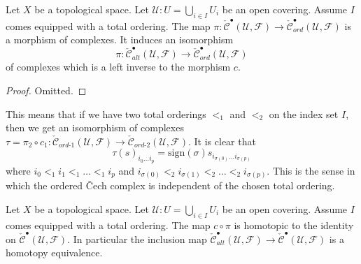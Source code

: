 \begin{lemma}
\label{lemma-project-to-ordered}
Let $X$ be a topological space.
Let $\mathcal{U} : U = \bigcup_{i \in I} U_i$ be an open covering.
Assume $I$ comes equipped with a total ordering.
The map $\pi : \check{\mathcal{C}}^\bullet(\mathcal{U}, \mathcal{F})
\to \check{\mathcal{C}}_{ord}^\bullet(\mathcal{U}, \mathcal{F})$
is a morphism of complexes. It induces an isomorphism
$$
\pi : \check{\mathcal{C}}_{alt}^\bullet(\mathcal{U}, \mathcal{F})
\to \check{\mathcal{C}}_{ord}^\bullet(\mathcal{U}, \mathcal{F})
$$
of complexes which is a left inverse to the morphism $c$.
\end{lemma}

\begin{proof}
Omitted.
\end{proof}

\begin{remark}
\label{remark-compared-ordered-complexes}
This means that if we have two total orderings $<_1$ and $<_2$ on
the index set $I$, then we get an isomorphism of complexes
$\tau = \pi_2 \circ c_1 :
\check{\mathcal{C}}_{ord\text{-}1}(\mathcal{U}, \mathcal{F}) \to
\check{\mathcal{C}}_{ord\text{-}2}(\mathcal{U}, \mathcal{F})$.
It is clear that
$$
\tau(s)_{i_0 \ldots i_p} =
\text{sign}(\sigma) s_{i_{\sigma(0)} \ldots i_{\sigma(p)}}
$$
where $i_0 <_1 i_1 <_1 \ldots <_1 i_p$ and
$i_{\sigma(0)} <_2 i_{\sigma(1)} <_2 \ldots <_2 i_{\sigma(p)}$.
This is the sense in which the ordered {\v C}ech complex is independent
of the chosen total ordering.
\end{remark}

\begin{lemma}
\label{lemma-alternating-usual}
\begin{reference}
\cite[Chapter I, \S 3, no. 20, Proposition 2, pp. 213--214]{FAC}
\end{reference}
Let $X$ be a topological space.
Let $\mathcal{U} : U = \bigcup_{i \in I} U_i$ be an open covering.
Assume $I$ comes equipped with a total ordering.
The map $c \circ \pi$ is homotopic to the identity on
$\check{\mathcal{C}}^\bullet(\mathcal{U}, \mathcal{F})$.
In particular the inclusion map
$\check{\mathcal{C}}_{alt}^\bullet(\mathcal{U}, \mathcal{F}) \to
\check{\mathcal{C}}^\bullet(\mathcal{U}, \mathcal{F})$
is a homotopy equivalence.
\end{lemma}


